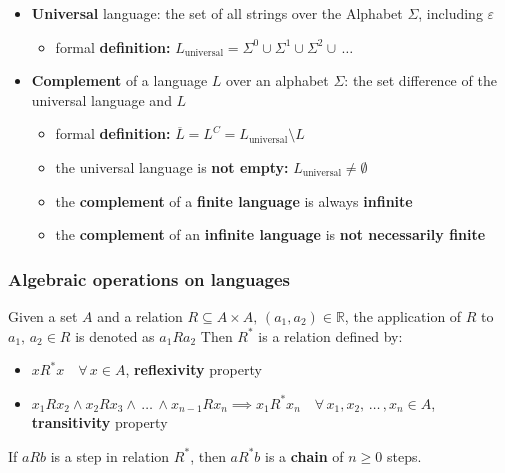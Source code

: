 \documentclass[english]{article}
\begin{document}
\begin{itemize}
  \item \textbf{Universal} language: the set of all strings over the Alphabet \(\Sigma\), including \(\varepsilon\)
        \begin{itemize}
          \item formal \textbf{definition:} \(L_{\text{universal}} = \Sigma^0 \cup \Sigma^1 \cup \Sigma^2 \cup \,\ldots\, \)
        \end{itemize}
  \item \textbf{Complement} of a language \(L\) over an alphabet \(\Sigma\): the set difference of the universal language and \(L\)
        \begin{itemize}
          \item formal \textbf{definition:} \(\overline{L} = L^C = L_{\text{universal}} \setminus L\)
          \item the universal language is \textbf{not empty:} \(L_{\text{universal}} \neq \emptyset\)
          \item the \textbf{complement} of a \textbf{finite language} is always \textbf{infinite}
          \item the \textbf{complement} of an \textbf{infinite language} is \textbf{not necessarily finite}
        \end{itemize}
\end{itemize}

\subsubsection{Algebraic operations on languages}

\begin{definition}
  Given a set \(A\) and a relation \(R \subseteq A \times A, \, (a_1, a_2) \in \mathbb{R}\),
  the application of \(R\) to \(a_1, \, a_2 \in R\) is denoted as \(a_1 R a_2\)
  Then \(R^\ast\) is a relation defined by:

  \begin{itemize}
    \item \(x R^\ast x \quad \forall \, x \in A\), \textbf{reflexivity} property
    \item \(x_1 R x_2 \land x_2 R x_3 \land \,\ldots\, \land x_{n-1} R x_n \implies x_1 R^\ast x_n \quad \forall \, x_1, x_2, \,\ldots\,, x_n \in A\), \textbf{transitivity} property
  \end{itemize}

  If \(a R b\) is a step in relation \(R^\ast\), then \(a R^\ast b\) is a \textbf{chain} of \(n \geq 0\) steps.
\end{definition}
\end{document}
